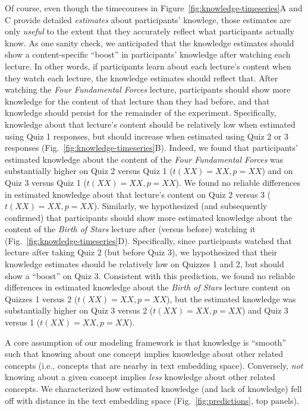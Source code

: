 \documentclass[10pt]{article}
\begin{document}
Of course, even though the timecourses in
Figure~\ref{fig:knowledge-timeseries}A and C provide detailed
\textit{estimates} about participants' knowlege, those estimates are only
\textit{useful} to the extent that they accurately reflect what participants
actually know. As one sanity check, we anticipated that the knowledge estimates
should show a content-specific ``boost'' in participants' knowledge after
watching each lecture. In other words, if participants learn about each
lecture's content when they watch each lecture, the knowledge estimates should
reflect that. After watching the \textit{Four Fundamental Forces} lecture,
participants should show more knowledge for the content of that lecture than
they had before, and that knowledge should persist for the remainder of the
experiment. Specifically, knowledge about that lecture's content should be
relatively low when estimated using Quiz 1 responses, but should increase when
estimated using Quiz 2 or 3 responses (Fig.~\ref{fig:knowledge-timeseries}B).
Indeed, we found that participants' estimated knowledge about the content of
the \textit{Four Fundamental Forces} was substantially higher on Quiz 2 versus
Quiz 1 ($t(XX) = XX, p = XX$) and on Quiz 3 versus Quiz 1 ($t(XX) = XX, p =
XX$). We found no reliable differences in estimated knowledge about that
lecture's content on Quiz 2 versus 3 ($t(XX) = XX, p = XX$). Similarly, we
hypothesized (and subsequently confirmed) that participants should show more
estimated knowledge about the content of the \textit{Birth of Stars} lecture
after (versus before) watching it (Fig.~\ref{fig:knowledge-timeseries}D).
Specifically, since participants watched that lecture after taking Quiz 2 (but
before Quiz 3), we hypothesized that their knowledge estimates should be
relatively low on Quizzes 1 and 2, but should show a ``boost'' on Quiz 3.
Consistent with this prediction, we found no reliable differences in estimated
knowledge about the \textit{Birth of Stars} lecture content on Quizzes 1 versus
2 ($t(XX) = XX, p = XX$), but the estimated knowledge was substantially higher
on Quiz 3 versus 2 ($t(XX) = XX, p = XX$) and Quiz 3 versus 1 ($t(XX) = XX, p =
XX$).

A core assumption of our modeling framework is that knowledge is ``smooth''
such that knowing about one concept implies knowledge about other related
concepts (i.e., concepts that are nearby in text embedding space). Conversely,
\textit{not} knowing about a given concept implies \textit{less} knowledge
about other related concepts. We characterized how estimated knowledge (and
lack of knowledge) fell off with distance in the text embedding space
(Fig.~\ref{fig:predictions}, top panels).
\end{document}
